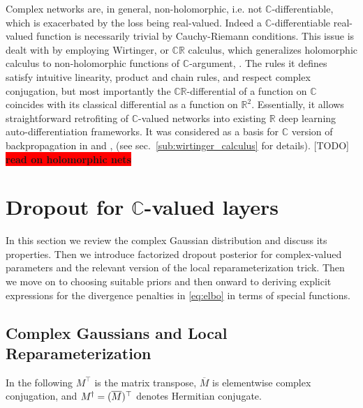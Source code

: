 \documentclass[a4paper,10pt]{article}
\newcommand{\real}{\mathbb{R}}
\newcommand{\cplx}{\mathbb{C}}
\newcommand{\hop}{{\mkern-1.5mu\dagger}}
\newcommand{\conj}[1]{\overline{#1}}
\newcommand{\important}[1]{\textbf{\!\colorbox{red}{#1}\!}}
\newcommand{\todo}[1]{{\color{blue} [TODO]} \important{#1}}
\begin{document}
Complex networks are, in general, non-holomorphic, i.e. not $\cplx$-differentiable, which is
exacerbated by the loss being real-valued. Indeed a $\cplx$-differentiable real-valued function is
necessarily trivial by Cauchy-Riemann conditions. This issue is dealt with by employing Wirtinger,
or $\cplx\real$ calculus, which generalizes holomorphic calculus to non-holomorphic functions
of $\cplx$-argument, \citep{adali_complex-valued_2011}. The rules it defines satisfy intuitive
linearity, product and chain rules, and respect complex conjugation, but most importantly the
$\cplx\real$-differential of a function on $\cplx$ coincides with its classical differential as
a function on $\real^2$. Essentially, it allows straightforward retrofiting of $\cplx$-valued
networks into existing $\real$ deep learning auto-differentiation frameworks. It was considered
as a basis for $\cplx$ version of backpropagation in \citep{benvenuto_complex_1992} and
\citep{trabelsi_deep_2017}, (see sec.~\ref{sub:wirtinger_calculus} for details).
%
\todo{read on holomorphic nets}



\section{Dropout for $\cplx$-valued layers} %
\label{sec:dropout_for_c_valued_layers}

In this section we review the complex Gaussian distribution and discuss its properties. Then
we introduce factorized dropout posterior for complex-valued parameters and the relevant
version of the local reparameterization trick. Then we move on to choosing suitable priors
and then onward to deriving explicit expressions for the divergence penalties in \eqref{eq:elbo}
in terms of special functions.

\subsection{Complex Gaussians and Local Reparameterization} %
\label{sub:c_gauss_and_local_rep}

In the following $M^{\top}$ is the matrix transpose, $\conj{M}$ is elementwise complex
conjugation, and $M^{\hop} = (\conj{M})^\top$ denotes Hermitian conjugate.
\end{document}
